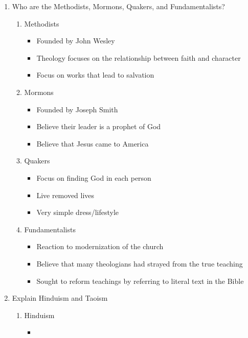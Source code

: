 \documentclass[8pt]{article}
\begin{document}
\begin{enumerate}
    \item Who are the Methodists, Mormons, Quakers, and Fundamentalists?
    \begin{enumerate}
        \item Methodists
        \begin{itemize}
            \item Founded by John Wesley
            \item Theology focuses on the relationship between faith and character
            \item Focus on works that lead to salvation
        \end{itemize}
        \item Mormons
        \begin{itemize}
            \item Founded by Joseph Smith
            \item Believe their leader is a prophet of God
            \item Believe that Jesus came to America
        \end{itemize}
        \item Quakers
        \begin{itemize}
            \item Focus on finding God in each person
            \item Live removed lives
            \item Very simple dress/lifestyle
        \end{itemize}
        \item Fundamentalists
        \begin{itemize}
            \item Reaction to modernization of the church
            \item Believe that many theologians had strayed from the true teaching
            \item Sought to reform teachings by referring to literal text in the Bible
        \end{itemize}
    \end{enumerate}

    \item Explain Hinduism and Taoism
    \begin{enumerate}
        \item Hinduism
        \begin{itemize}
            \item 
        \end{itemize}
    \end{enumerate}
\end{enumerate}
\end{document}
